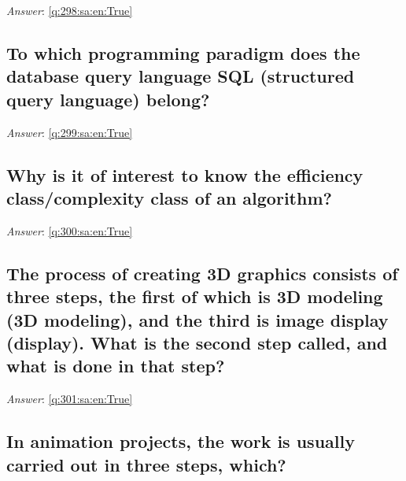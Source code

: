 \documentclass[a4paper,11pt,oneside]{article}
\begin{document}
\begin{sloppypar}
\textit{Answer}: \autoref{q:298:sa:en:True}



\subsection{To which programming paradigm does the database query language SQL (structured query language) belong?}

\label{q:299:sa:en:False}

\vspace{2cm}

\noindent\makebox[\textwidth]{\hrulefill}

\vspace{1cm}

\textit{Answer}: \autoref{q:299:sa:en:True}



\subsection{Why is it of interest to know the efficiency class/complexity class of an algorithm?}

\label{q:300:sa:en:False}

\vspace{2cm}

\noindent\makebox[\textwidth]{\hrulefill}

\vspace{1cm}

\textit{Answer}: \autoref{q:300:sa:en:True}



\subsection{The process of creating 3D graphics consists of three steps, the first of which is 3D modeling (3D modeling), and the third is image display (display). What is the second step called, and what is done in that step?}

\label{q:301:sa:en:False}

\vspace{2cm}

\noindent\makebox[\textwidth]{\hrulefill}

\vspace{1cm}

\textit{Answer}: \autoref{q:301:sa:en:True}



\subsection{In animation projects, the work is usually carried out in three steps, which?}


\end{sloppypar}
\end{document}
